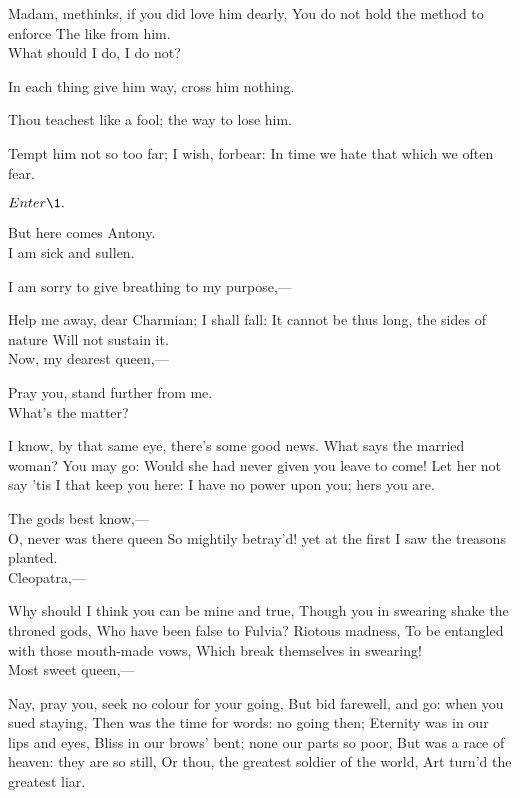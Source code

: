 \documentclass{book}
\begin{document}
\7	Madam, methinks, if you did love him dearly,
	You do not hold the method to enforce
	The like from him. \\

\2	                  What should I do, I do not?

\7	In each thing give him way, cross him nothing.

\2	Thou teachest like a fool; the way to lose him.

\7	Tempt him not so too far; I wish, forbear:
	In time we hate that which we often fear.

	\(Enter \1.\)

	But here comes Antony. \\

\2	I am sick and sullen.

\1	I am sorry to give breathing to my purpose,---

\2	Help me away, dear Charmian; I shall fall:
	It cannot be thus long, the sides of nature
	Will not sustain it. \\

\1	Now, my dearest queen,---

\2	Pray you, stand further from me. \\

\1	What's the matter?

\2	I know, by that same eye, there's some good news.
	What says the married woman? You may go:
	Would she had never given you leave to come!
	Let her not say 'tis I that keep you here:
	I have no power upon you; hers you are.

\1	The gods best know,--- \\

\2	O, never was there queen
	So mightily betray'd! yet at the first
	I saw the treasons planted. \\

\1	Cleopatra,---

\2	Why should I think you can be mine and true,
	Though you in swearing shake the throned gods,
	Who have been false to Fulvia? Riotous madness,
	To be entangled with those mouth-made vows,
	Which break themselves in swearing! \\

\1	Most sweet queen,---

\2	Nay, pray you, seek no colour for your going,
	But bid farewell, and go: when you sued staying,
	Then was the time for words: no going then;
	Eternity was in our lips and eyes,
	Bliss in our brows' bent; none our parts so poor,
	But was a race of heaven: they are so still,
	Or thou, the greatest soldier of the world,
	Art turn'd the greatest liar. \\
\end{document}
